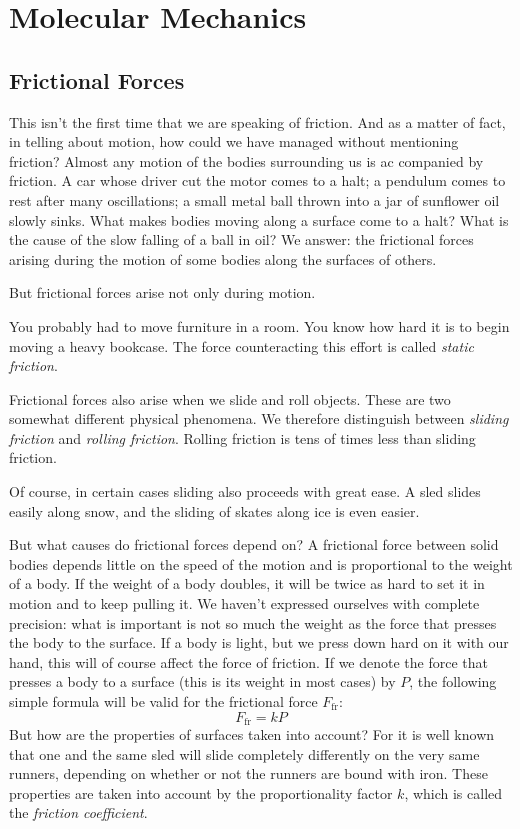 

\cleardoublepage
\chapter{Molecular Mechanics}
\label{ch-06}

\section{Frictional Forces}

This isn’t the first time that we are speaking of fric­tion. And as a matter of fact, in telling about motion, how could we have managed without mentioning friction? Almost any motion of the bodies surrounding us is ac­ companied by friction. A car whose driver cut the motor comes to a halt; a pendulum comes to rest after many oscillations; a small metal ball thrown into a jar of sunflower oil slowly sinks. What makes bodies moving along a surface come to a halt? What is the cause of the slow falling of a ball in oil? We answer: the frictional forces arising during the motion of some bodies along the sur­faces of others.

But frictional forces arise not only during motion.

You probably had to move furniture in a room. You know how hard it is to begin moving a heavy bookcase. The force counteracting this effort is called \emph{static friction}.

Frictional forces also arise when we slide and roll objects. These are two somewhat different physical phe­nomena. We therefore distinguish between \emph{sliding fric­tion} and \emph{rolling friction}. Rolling friction is tens of times less than sliding friction.

Of course, in certain cases sliding also proceeds with great ease. A sled slides easily along snow, and the sliding of skates along ice is even easier.

But what causes do frictional forces depend on? A frictional force between solid bodies depends little on the speed of the motion and is proportional to the weight of a body. If the weight of a body doubles, it will be twice as hard to set it in motion and to keep pulling it. We haven’t expressed ourselves with complete precision: what is important is not so much the weight as the force that presses the body to the surface. If a body is light, but we press down hard on it with our hand, this will of course affect the force of friction. If we denote the force that presses a body to a surface (this is its weight in most cases) by $P$, the following simple formula will be valid for the frictional force $F_{\textrm{fr}}$:
\begin{equation*}%
F_{\textrm{fr}} = kP
\end{equation*}
But how are the properties of surfaces taken into account? For it is well known that one and the same sled will slide completely differently on the very same runners, depending on whether or not the runners are bound with iron. These properties are taken into account by the pro­portionality factor $k$, which is called the \emph{friction coeffi­cient}.

